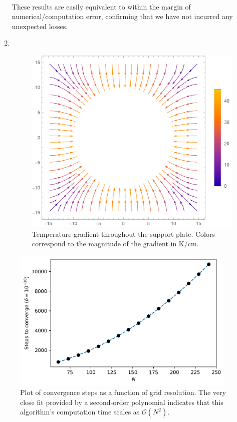 \documentclass{article}
\begin{document}
\begin{enumerate}[label=\alph*)]
\begin{gather*}
    \end{gather*}
    These results are easily equivalent to within the margin of numerical/computation error, confirming that we have not incurred any unexpected losses.
    \newpage
    \item $ $ \begin{figure}[H]
        \centering
        \includegraphics[width=5in]{homework10/2c.png}
        \caption{Temperature gradient throughout the support plate. Colors correspond to the magnitude of the gradient in K/cm.}
        \label{fig:2c}
    \end{figure}
\end{enumerate}

\medskip

\begin{figure}[H]
    \centering
    \includegraphics[width=4.25in]{homework10/3.png}
    \caption{Plot of convergence steps as a function of grid resolution. The very close fit provided by a second-order polynomial indicates that this algorithm's computation time scales as $\mathcal{O}(N^2)$.}
    \label{fig:3}
\end{figure}
\end{document}
